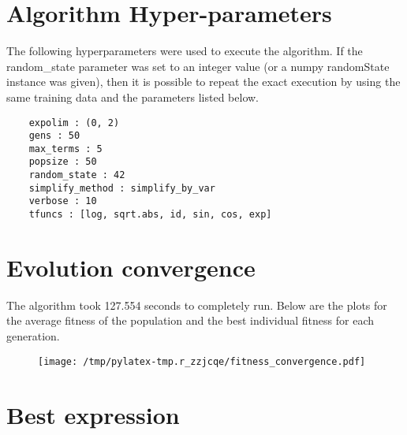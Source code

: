 \documentclass{article}%
\begin{document}
%
\vfill \pagebreak

%
\section*{Algorithm Hyper-parameters}%
\label{sec:AlgorithmHyper{-}parameters}%

                The following hyperparameters were used to execute the
                algorithm. If the random\_state parameter was set to an 
                integer value (or a numpy randomState instance was given), then
                it is possible to repeat the exact execution by using the same
                training data and the parameters listed below.%
{\footnotesize \begin{verbatim}    expolim : (0, 2)
    gens : 50
    max_terms : 5
    popsize : 50
    random_state : 42
    simplify_method : simplify_by_var
    verbose : 10
    tfuncs : [log, sqrt.abs, id, sin, cos, exp]\end{verbatim} } \vfill \pagebreak

%

            \chead{}
            \rhead{\today, \currenttime}
            
            \lfoot{}
            \cfoot{}
            \rfoot{\thepage\ | \pageref{LastPage}}
\section*{Evolution convergence}%
\label{sec:Evolutionconvergence}%

                The algorithm took 127.554 seconds to
                completely run. Below are the plots for the average fitness
                of the population and the best individual fitness for each
                generation.\vfill%


\begin{figure}[H]%
\centering%
\texttt{[image: /tmp/pylatex-tmp.r\_zzjcqe/fitness\_convergence.pdf]}%
\end{figure}

%
\vfill \pagebreak

%
\section*{Best expression}%
\label{sec:Bestexpression}%
\end{document}
